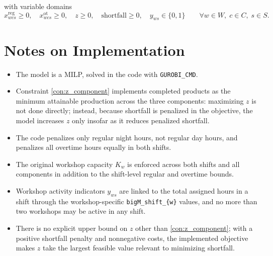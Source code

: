 with variable domains
\[
x^{\mathrm{reg}}_{wcs}\ge 0,\quad
x^{\mathrm{ot}}_{wcs}\ge 0,\quad
z\ge 0,\quad
\mathrm{shortfall}\ge 0,\quad
y_{ws}\in\{0,1\}
\qquad
\forall w\in W,\; c\in C,\; s\in S.
\]

\section*{Notes on Implementation}

\begin{itemize}
    \item The model is a MILP, solved in the code with \texttt{GUROBI\_CMD}.
    \item Constraint \eqref{con:z_component} implements completed products as the minimum attainable production across the three components: maximizing $z$ is not done directly; instead, because shortfall is penalized in the objective, the model increases $z$ only insofar as it reduces penalized shortfall.
    \item The code penalizes only regular night hours, not regular day hours, and penalizes all overtime hours equally in both shifts.
    \item The original workshop capacity $K_w$ is enforced across both shifts and all components in addition to the shift-level regular and overtime bounds.
    \item Workshop activity indicators $y_{ws}$ are linked to the total assigned hours in a shift through the workshop-specific \texttt{bigM\_shift\_\{w\}} values, and no more than two workshops may be active in any shift.
    \item There is no explicit upper bound on $z$ other than \eqref{con:z_component}; with a positive shortfall penalty and nonnegative costs, the implemented objective makes $z$ take the largest feasible value relevant to minimizing shortfall.
\end{itemize}
